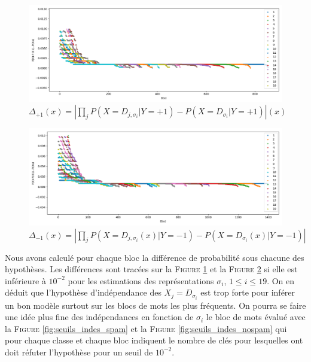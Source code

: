 \documentclass[a4paper, french]{article}
\begin{document}
\begin{figure}[h]
\begin{center}
    \caption{%
    $\Delta_{+1}(x)=\left|\prod _j P(X=D_{j,\sigma_i}|Y=+1)-P(X=D_{\sigma_i}|Y=+1)\right|(x)$}
    \label{fig:blocs_indes_spam}
    \includegraphics[width=13cm]{blocs_indes_spam}
\end{center}
\end{figure}
\begin{figure}[h]
\begin{center}
    \caption{%
    $\Delta_{-1}(x)=\left|\prod _j P(X=D_{j,\sigma_i}(x)|Y=-1)-P(X=D_{\sigma_i}(x)|Y=-1)\right|$}
    \label{fig:blocs_indes_nospam}
    \includegraphics[width=13cm]{blocs_indes_nospam}
\end{center}
\end{figure}

Nous avons calcul\'e pour chaque bloc la diff\'erence de probabilit\'e
sous chacune des hypoth\`eses. Les diff\'erences sont trac\'ees sur la
F\textsc{igure} \ref{fig:blocs_indes_spam} et la F\textsc{igure}
\ref{fig:blocs_indes_nospam} si elle est inf\'erieure \`a $10^{-2}$ 
pour les estimations des repr\'esentations $\sigma_i$, $1\leq i\leq 19$.
On en d\'eduit que l'hypoth\`ese d'ind\'ependance des $X_j=D_{\sigma_i}$
est trop forte pour inf\'erer un bon mod\`ele surtout sur les blocs de
mots les plus fr\'equents. On pourra se faire une id\'ee plus fine 
des ind\'ependances en fonction de $\sigma_i$ le bloc de mots 
\'evalu\'e avec la F\textsc{igure} \ref{fig:seuils_indes_spam} et
la F\textsc{igure} \ref{fig:seuils_indes_nospam} qui pour chaque classe
et chaque bloc indiquent le nombre de cl\'es pour lesquelles ont doit
r\'efuter l'hypoth\`ese pour un seuil de $10^{-2}$.
\end{document}
